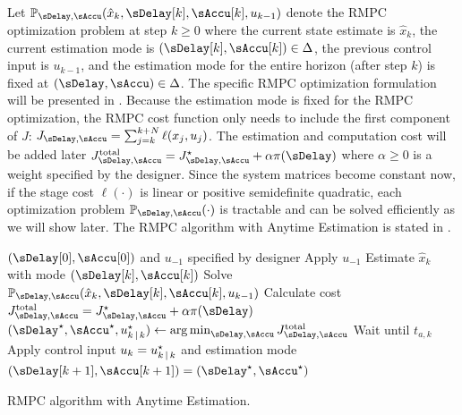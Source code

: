 Let $\MPCProb{\sDelay,\sAccu}(\hat{x}_{k},\sDelay[k],\sAccu[k],u_{k-1})$
denote the RMPC optimization problem at step $k\geq0$ where the current
state estimate is $\hat{x}_{k}$, the current estimation mode is $(\sDelay[k],\sAccu[k])\in\Delta$,
the previous control input is $u_{k-1}$, and the estimation mode
for the entire horizon (after step $k$) is fixed at $(\sDelay,\sAccu)\in\Delta$.
The specific RMPC optimization formulation will be presented in .
Because the estimation mode is fixed for the RMPC optimization, the
RMPC cost function only needs to include the first component of $J$:
$J_{\sDelay,\sAccu}=\sum_{j=k}^{k+N}\ell(x_{j},u_{j})$. The estimation
and computation cost will be added later $J_{\sDelay,\sAccu}^{\mathrm{total}}=J_{\sDelay,\sAccu}^{\star}+\alpha\pi(\sDelay)$
where $\alpha\geq0$ is a %
weight specified by the designer.
Since the system matrices become constant now, if the stage cost $\ell(\cdot)$
is linear or positive semidefinite quadratic, each optimization problem
$\MPCProb{\sDelay,\sAccu}(\cdot)$ is tractable and can be solved
efficiently as we will show later. The RMPC algorithm with Anytime Estimation is stated in .

\begin{algorithm}
\begin{algorithmic}[1]
\State $\left(\sDelay[0], \sAccu[0]\right)$ and $u_{-1}$ specified by designer
\State Apply $u_{-1}$
	\State Estimate $\hat{x}_{k}$ with mode $\left(\sDelay[k], \sAccu[k]\right)$
		\State Solve $\MPCProb{\sDelay,\sAccu}(\hat{x}_{k},\sDelay[k],\sAccu[k],u_{k-1})$
		\State Calculate cost $J_{\sDelay,\sAccu}^{\mathrm{total}} = J_{\sDelay,\sAccu}^{\star} + \alpha \pi(\sDelay)$
	\EndFor
	\State $( \sDelay^{\star}, \sAccu^{\star}, u_{k \Given k}^{\star} ) \gets \argmin_{\sDelay,\sAccu} J_{\sDelay,\sAccu}^{\mathrm{total}}$
	\State Wait until $t_{a,k}$
	\State Apply control input $u_{k} = u_{k \,|\, k}^{\star}$ and estimation mode $\left( \sDelay[k+1], \sAccu[k+1] \right) = \left( \sDelay^{\star}, \sAccu^{\star} \right)$
\EndFor
\end{algorithmic} 

\caption{RMPC algorithm with Anytime Estimation.}
\label{algo:RMPC-algo}
\end{algorithm}

